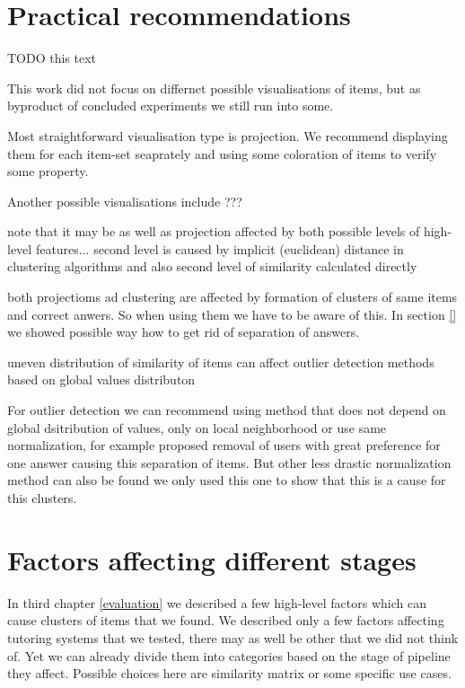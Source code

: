 \documentclass[
  digital, %
  table,   %
  nolof,     %
  nolot,     %
  nocover,
  color,
  final, %
]{fithesis3}
\begin{document}
\section{Practical recommendations}\label{practical-recommendations}

TODO this text


This work did not focus on differnet possible visualisations of items, but as byproduct of concluded experiments we still run into some.

Most straightforward visualisation type is projection. We recommend displaying them for each item-set seaprately and using some coloration of items to verify some property.

Another possible visualisations include ??? %


note that it may be as well as projection affected by both possible levels of high-level features... second level is caused by implicit (euclidean) distance in clustering algorithms %
and also second level of similarity calculated directly

both projectioms ad clustering are affected by formation of clusters of same items and correct anwers. So when using them we have to be aware of this. In section \ref{} we showed possible way how to get rid of separation of answers.

uneven distribution of similarity of items can affect outlier detection methods based on global values distributon


For outlier detection we can recommend using method that does not depend on global dsitribution of values, only on local neighborhood
or
use same normalization, for example proposed removal of users with great preference for one answer causing this separation of items. But other less drastic normalization method can also be found we only used this one to show that this is a cause for this clusters.


\section{Factors affecting different stages}\label{factors-affecting-different-stages}

In third chapter \ref{evaluation} we described a few high-level factors which can cause clusters of items that we found. We described only a few factors affecting tutoring systems that we tested, there may as well be other that we did not think of. Yet we can already divide them into categories based on the stage of pipeline they affect. Possible choices here are similarity matrix or some specific use cases.
\end{document}
